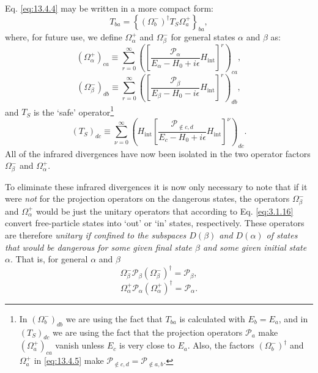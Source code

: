 Eq. \eqref{eq:13.4.4} may be written in a more compact form:
\begin{equation}
T_{ba}=\left\{(\Omega_b^-)^\dagger T_S\Omega_a^+\right\}_{ba},
\tag{13.4.5}\label{eq:13.4.5}
\end{equation}
where, for future use, we define $\Omega_\alpha^+$ and $\Omega_\beta^-$ for
general states $\alpha$ and $\beta$ as:
\begin{equation}
(\Omega_\alpha^+)_{ca}\equiv
\sum_{r=0}^{\infty}
\left(\left[\frac{\mathcal P_\alpha}{E_\alpha-H_0+i\epsilon}
H_{\mathrm{int}}\right]^r\right)_{ca},
\tag{13.4.6}\label{eq:13.4.6}
\end{equation}
\begin{equation}
(\Omega_\beta^-)_{db}\equiv
\sum_{r=0}^{\infty}
\left(\left[\frac{\mathcal P_\beta}{E_\beta-H_0-i\epsilon}
H_{\mathrm{int}}\right]^r\right)_{db},
\tag{13.4.7}\label{eq:13.4.7}
\end{equation}
and $T_S$ is the `safe' operator\footnote{In $(\Omega_b^-)_{db}$ we are using
the fact that $T_{ba}$ is calculated with $E_b=E_a$, and in $(T_S)_{dc}$ we
are using the fact that the projection operators $\mathcal P_a$ make
$(\Omega_a^+)_{ca}$ vanish unless $E_c$ is very close to $E_a$. Also, the
factors $(\Omega_b^-)^\dagger$ and $\Omega_a^+$ in
\eqref{eq:13.4.5} make
$\mathcal P_{\notin c,d}=\mathcal P_{\notin a,b}$.}
\begin{equation}
(T_S)_{dc}\equiv\sum_{\nu=0}^{\infty}
\left(H_{\mathrm{int}}
\left[\frac{\mathcal P_{\notin c,d}}{E_c-H_0+i\epsilon}
H_{\mathrm{int}}\right]^\nu\right)_{dc}.
\tag{13.4.8}\label{eq:13.4.8}
\end{equation}
All of the infrared divergences have now been isolated in the two operator
factors $\Omega_\beta^-$ and $\Omega_\alpha^+$.

To eliminate these infrared divergences it is now only necessary to note that
if it were \emph{not} for the projection operators on the dangerous states,
the operators $\Omega_\beta^-$ and $\Omega_\alpha^+$ would be just the unitary
operators that according to Eq. \eqref{eq:3.1.16} convert free-particle states
into `out' or `in' states, respectively. These operators are therefore
\emph{unitary if confined to the subspaces $D(\beta)$ and $D(\alpha)$ of
states that would be dangerous for some given final state $\beta$ and some
given initial state $\alpha$}. That is, for general $\alpha$ and $\beta$
\begin{equation}
\Omega_\beta^-\mathcal P_\beta(\Omega_\beta^-)^\dagger
=\mathcal P_\beta,
\tag{13.4.9}\label{eq:13.4.9}
\end{equation}
\begin{equation}
\Omega_\alpha^+\mathcal P_\alpha(\Omega_\alpha^+)^\dagger
=\mathcal P_\alpha.
\tag{13.4.10}\label{eq:13.4.10}
\end{equation}

